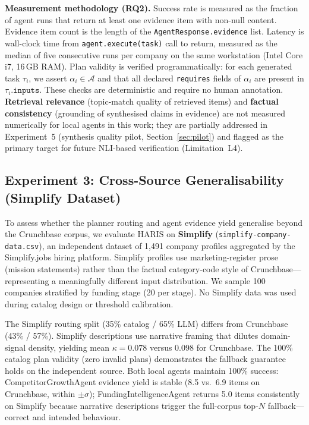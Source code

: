 \documentclass[preprint,12pt]{elsarticle}
\newcommand{\calA}{\mathcal{A}}
\begin{document}
\textbf{Measurement methodology (RQ2).} Success rate is measured as the fraction
of agent runs that return at least one evidence item with non-null content.
Evidence item count is the length of the \texttt{AgentResponse.evidence} list.
Latency is wall-clock time from \texttt{agent.execute(task)} call to return,
measured as the median of five consecutive runs per company on the same
workstation (Intel Core i7, 16\,GB RAM). Plan validity is verified
programmatically: for each generated task $\tau_i$, we assert $\alpha_i \in
\calA$ and that all declared \texttt{requires} fields of $\alpha_i$ are present
in $\tau_i.\texttt{inputs}$. These checks are deterministic and require no human
annotation. \textbf{Retrieval relevance} (topic-match quality of retrieved items)
and \textbf{factual consistency} (grounding of synthesised claims in evidence)
are not measured numerically for local agents in this work; they are partially
addressed in Experiment~5 (synthesis quality pilot, Section~\ref{sec:pilot}) and
flagged as the primary target for future NLI-based verification
(Limitation~L4).

\subsection{Experiment 3: Cross-Source Generalisability (Simplify Dataset)}
\label{sec:exp3}

To assess whether the planner routing and agent evidence yield generalise beyond
the Crunchbase corpus, we evaluate HARIS on \textbf{Simplify}
(\texttt{simplify-company-data.csv}), an independent dataset of 1,491 company
profiles aggregated by the Simplify.jobs hiring platform. Simplify profiles use
marketing-register prose (mission statements) rather than the factual
category-code style of Crunchbase---representing a meaningfully different input
distribution. We sample 100 companies stratified by funding stage (20 per stage).
No Simplify data was used during catalog design or threshold calibration.

The Simplify routing split (35\% catalog / 65\% LLM) differs from Crunchbase
(43\% / 57\%). Simplify descriptions use narrative framing that dilutes
domain-signal density, yielding mean $\kappa{=}0.078$ versus 0.098 for
Crunchbase. The 100\% catalog plan validity (zero invalid plans) demonstrates the
fallback guarantee holds on the independent source. Both local agents maintain
100\% success: CompetitorGrowthAgent evidence yield is stable (8.5 vs.\ 6.9
items on Crunchbase, within $\pm\sigma$); FundingIntelligenceAgent returns 5.0 items
consistently on Simplify because narrative descriptions trigger the full-corpus
top-$N$ fallback---correct and intended behaviour.
\end{document}
